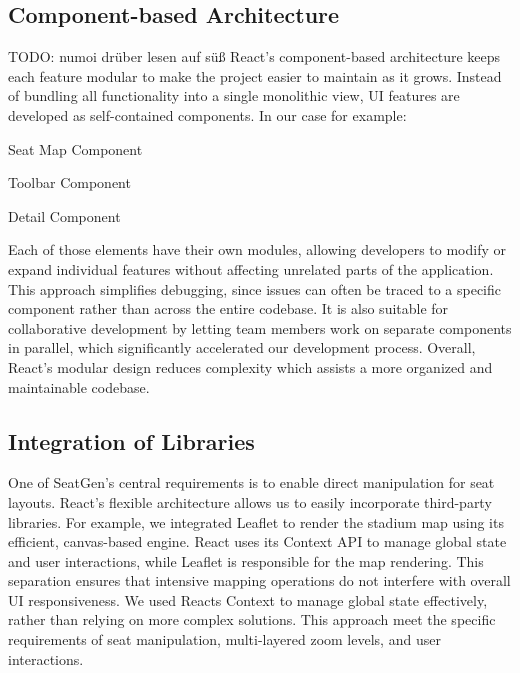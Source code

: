\subsection{Component-based Architecture}
TODO: numoi drüber lesen auf süß
React’s component-based architecture keeps each feature modular to make the project easier to maintain as it grows. Instead of bundling all functionality into a single monolithic view, UI features are developed as self-contained components. In our case for example:
\begin{compactitem}
    \item Seat Map Component
    \item Toolbar Component
    \item Detail Component
\end{compactitem}
Each of those elements have their own modules, allowing developers to modify or expand individual features without affecting unrelated parts of the application. This approach simplifies debugging, since issues can often be traced to a specific component rather than across the entire codebase. It is also suitable for collaborative development by letting team members work on separate components in parallel, which significantly accelerated our development process. Overall, React’s modular design reduces complexity which assists a more organized and maintainable codebase.
~\cite{ReactCBA01, ReactCBA02, ReactCBA03}

\subsection{Integration of Libraries}
One of SeatGen’s central requirements is to enable direct manipulation for seat layouts. React’s flexible architecture 
allows us to easily incorporate third-party libraries. For example, we integrated Leaflet to render the stadium map using its efficient, canvas-based engine. React uses its Context API to manage global state and user interactions, while Leaflet is responsible for the map rendering. This separation ensures that intensive mapping operations do not interfere with overall UI responsiveness. We used Reacts Context to manage global state effectively, rather than relying on more complex solutions. This approach meet the specific requirements of seat manipulation, multi-layered zoom levels, and user interactions.



